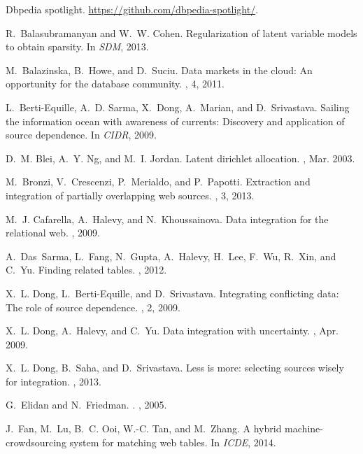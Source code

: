 \documentclass{sig-alternate}
\begin{document}
{\small
\begin{thebibliography}{10}

Dbpedia spotlight.
\newblock \url{https://github.com/dbpedia-spotlight/}.

R.~Balasubramanyan and W.~W. Cohen.
\newblock Regularization of latent variable models to obtain sparsity.
\newblock In {\em SDM}, 2013.

M.~Balazinska, B.~Howe, and D.~Suciu.
\newblock Data markets in the cloud: An opportunity for the database community.
, 4, 2011.

L.~Berti-Equille, A.~D. Sarma, X.~Dong, A.~Marian, and D.~Srivastava.
\newblock Sailing the information ocean with awareness of currents: Discovery
  and application of source dependence.
\newblock In {\em CIDR}, 2009.

D.~M. Blei, A.~Y. Ng, and M.~I. Jordan.
\newblock Latent dirichlet allocation.
, Mar. 2003.

M.~Bronzi, V.~Crescenzi, P.~Merialdo, and P.~Papotti.
\newblock Extraction and integration of partially overlapping web sources.
, 3, 2013.

M.~J. Cafarella, A.~Halevy, and N.~Khoussainova.
\newblock Data integration for the relational web.
, 2009.

A.~Das~Sarma, L.~Fang, N.~Gupta, A.~Halevy, H.~Lee, F.~Wu, R.~Xin, and C.~Yu.
\newblock Finding related tables.
, 2012.

X.~L. Dong, L.~Berti-Equille, and D.~Srivastava.
\newblock Integrating conflicting data: The role of source dependence.
, 2, 2009.

X.~L. Dong, A.~Halevy, and C.~Yu.
\newblock Data integration with uncertainty.
, Apr. 2009.

X.~L. Dong, B.~Saha, and D.~Srivastava.
\newblock Less is more: selecting sources wisely for integration.
, 2013.

G.~Elidan and N.~Friedman.
.
, 2005.

J.~Fan, M.~Lu, B.~C. Ooi, W.-C. Tan, and M.~Zhang.
\newblock A hybrid machine-crowdsourcing system for matching web tables.
\newblock In {\em ICDE}, 2014.


\end{thebibliography}}
\end{document}
